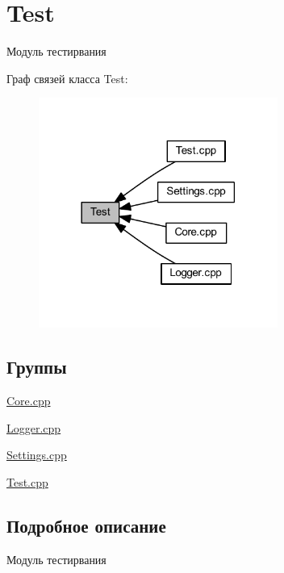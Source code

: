 \hypertarget{group__test}{}\section{Test}
\label{group__test}


Модуль тестирвания  


Граф связей класса Test\+:
\nopagebreak
\begin{figure}[H]
\begin{center}
\leavevmode
\includegraphics[width=222pt]{group__test}
\end{center}
\end{figure}
\subsection*{Группы}
\begin{DoxyCompactItemize}
\item 
\mbox{\hyperlink{group__corecpp}{Core.\+cpp}}
\item 
\mbox{\hyperlink{group__loggercpp}{Logger.\+cpp}}
\item 
\mbox{\hyperlink{group__settingscpp}{Settings.\+cpp}}
\item 
\mbox{\hyperlink{group__testcpp}{Test.\+cpp}}
\end{DoxyCompactItemize}


\subsection{Подробное описание}
Модуль тестирвания 

